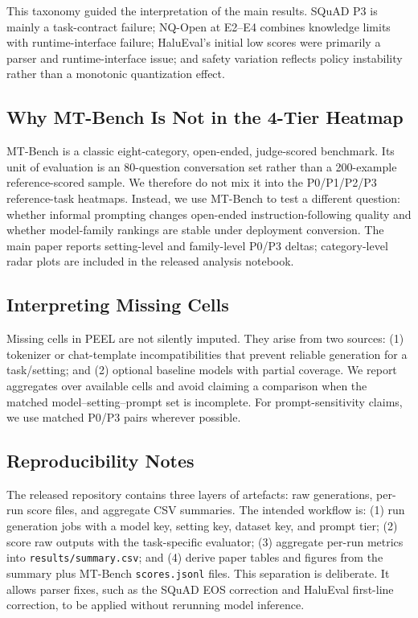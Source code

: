 \documentclass[letterpaper]{article} %
\begin{document}
This taxonomy guided the interpretation of the main results. SQuAD P3 is mainly
a task-contract failure; NQ-Open at E2--E4 combines knowledge limits with
runtime-interface failure; HaluEval's initial low scores were primarily a parser
and runtime-interface issue; and safety variation reflects policy instability
rather than a monotonic quantization effect.

\subsection{Why MT-Bench Is Not in the 4-Tier Heatmap}

MT-Bench is a classic eight-category, open-ended, judge-scored benchmark. Its
unit of evaluation is an 80-question conversation set rather than a 200-example
reference-scored sample. We therefore do not mix it into the P0/P1/P2/P3
reference-task heatmaps. Instead, we use MT-Bench to test a different question:
whether informal prompting changes open-ended instruction-following quality and
whether model-family rankings are stable under deployment conversion. The main
paper reports setting-level and family-level P0/P3 deltas; category-level radar
plots are included in the released analysis notebook.

\subsection{Interpreting Missing Cells}

Missing cells in PEEL are not silently imputed. They arise from two
sources: (1) tokenizer or chat-template incompatibilities that
prevent reliable generation for a task/setting; and (2) optional baseline models
with partial coverage. We report aggregates over available cells and avoid
claiming a comparison when the matched model--setting--prompt set is incomplete.
For prompt-sensitivity claims, we use matched P0/P3 pairs wherever possible.

\subsection{Reproducibility Notes}

The released repository contains three layers of artefacts: raw generations,
per-run score files, and aggregate CSV summaries. The intended workflow is:
(1) run generation jobs with a model key, setting key, dataset key, and prompt
tier; (2) score raw outputs with the task-specific evaluator; (3) aggregate
per-run metrics into \texttt{results/summary.csv}; and (4) derive paper tables
and figures from the summary plus MT-Bench \texttt{scores.jsonl} files. This
separation is deliberate. It allows parser fixes, such as the SQuAD EOS
correction and HaluEval first-line correction, to be applied without rerunning
model inference.
\end{document}
